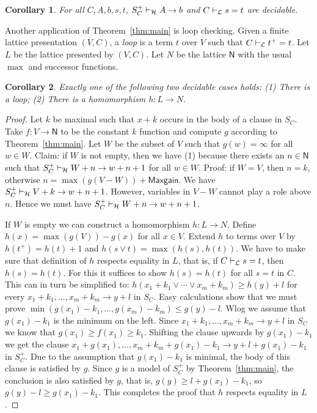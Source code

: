 \documentclass[11pt,a4paper]{article}
\newtheorem{corollary}{Corollary}[theorem]
\newcommand{\N}{\mathsf{N}}
\newcommand\jterm[3]{{{#1_1}+{#2_1}}\vee\cdots\vee{{#1_#3}+{#2_#3}}}
\newcommand\jbody[3]{{{#1_1}+{#2_1}},\ldots,{{#1_#3}+{#2_#3}}}
\newcommand\lathy{{\cal L}}
\newcommand\prvL{\vdash_{\lathy}}
\newcommand\prvH{\vdash_{\cal H}}
\newcommand\M{\mathsf{Maxgain}}
\begin{document}
\begin{corollary}\label{cor:decidability}
For all $C,A,b,s,t$, $S^+_C\prvH A\to b$ and $C\prvL s=t$ are decidable.
\end{corollary}

Another application of Theorem~\ref{thm:main} is loop checking.
Given a finite lattice presentation $(V,C)$, a \emph{loop} is a 
term $t$ over $V$ such that $C\prvL t^+=t$. Let $L$ be the
lattice presented by $(V,C)$. Let $N$ be the lattice $\N$ with
the usual $\max$ and successor functions.

\begin{corollary}\label{cor:loopchecking}
Exactly one of the following two decidable cases holds:
(1) There is a loop;
(2) There is a homomorphism $h: L\to N$.
\end{corollary}
\begin{proof}
Let $k$ be maximal such that $x+k$ occurs in the body of a clause in $S_C$.
Take $f: V\to\N$ to be the constant $k$ function and compute $g$ according
to Theorem~\ref{thm:main}. Let $W$ be the subset of $V$ such that 
$g(w)=\infty$ for all $w\in W$. Claim: if $W$ is not empty,
then we have (1) because there exists an $n\in\N$ such that 
$S^+_C\prvH W+n \to w+n+1$ for all $w\in W$.
Proof: if $W=V$, then $n=k$, otherwise $n= \max(g(V-W))+\M$.
We have $S^+_C\prvH V+k \to w+n+1$. However,
variables in $V-W$ cannot play a role above $n$.
Hence we must have $S^+_C\prvH W+n \to w+n+1$.

If $W$ is empty we can construct a homomorphism $h: L\to N$.
Define $h(x) = \max(g(V))- g(x)$ for all $x\in V$. 
Extend $h$ to terms over $V$ by $h(t^+) = h(t)+1$ 
and $h(s\vee t) = \max(h(s),h(t))$.
We have to make sure that definition of $h$ respects
equality in $L$, that is, if $C\prvL s=t$, then $h(s)=h(t)$.
For this it suffices to show $h(s)=h(t)$ for all $s=t$ in $C$.
This can in turn be simplified to: $h(\jterm{x}{k}{m}) \geq h(y)+l$ 
for every $\jbody{x}{k}{m} \to y+l$ in $S_C$.
Easy calculations show that we must prove
$\min(g(x_1)-k_1,\ldots,g(x_m)-k_m) \leq g(y)-l$.
Wlog we assume that $g(x_1)-k_1$ is the minimum on the left.
Since $\jbody{x}{k}{m} \to y+l$ in $S_C$ we know 
that $g(x_1)\geq f(x_1)\geq k_1$. Shifting the clause
upwards by $g(x_1)-k_1$ we get the clause
$x_1+g(x_1),\ldots,x_m+k_m+g(x_1)-k_1 \to y+l+g(x_1)-k_1$
in $S_C^+$. Due to the assumption that $g(x_1)-k_1$ is minimal,
the body of this clause is satisfied by $g$.
Since $g$ is a model of $S_C^+$ by Theorem~\ref{thm:main},
the conclusion is also satisfied by $g$, that is,
$g(y)\geq l+g(x_1)-k_1$, so $g(y)-l\geq g(x_1)-k_1$.
This completes the proof that $h$ respects equality in $L$.
\end{proof}
\end{document}
